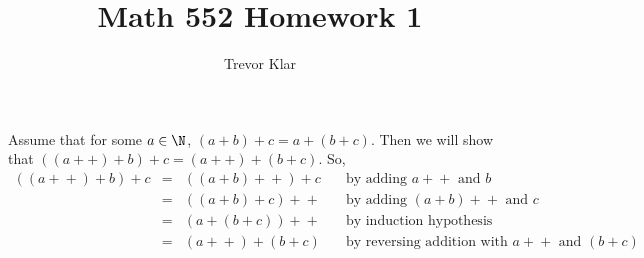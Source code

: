 \documentclass[letterpaper]{article}
\title{Math 552 \linebreak
Homework 1}
\author{Trevor Klar}
\newcommand{\pp}{\!\!+\!\!+}
\begin{document}
\maketitle

Assume that for some $a\in\N$, $(a+b)+c=a+(b+c)$. Then we will show that $((a++)+b)+c=(a++)+(b+c)$. So,
$$\begin{array}{rcll}
  ((a\pp)+b)+c &=& ((a+b)\pp)+c &\quad\text{by adding }a\pp \text{ and } b\\
  &=&((a+b)+c)\pp &\quad\text{by adding }(a+b)\pp \text{ and } c\\
  &=&(a+(b+c))\pp &\quad\text{by induction hypothesis}\\
  &=&(a\pp)+(b+c) &\quad\text{by reversing addition with }a\pp \text{ and } (b+c)\\
\end{array}$$
\end{document}
